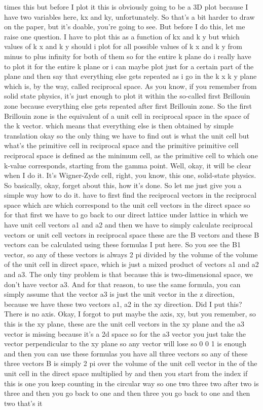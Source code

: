 times this but before I plot it this is obviously going to be a 3D plot because I have two variables here, kx and ky, unfortunately. So that's a bit harder to draw on the paper, but it's doable, you're going to see.
But before I do this, let me raise one question. I have to plot this as a function of kx and k y but which values of k x and k y should i plot for all possible values of k x and k y from minus to plus infinity for both of them so for the entire k plane do i really have to plot it for the entire k plane or i can maybe plot just for a certain part of the plane and then say that everything else gets repeated as i go in the k x k y plane which is, by the way, called reciprocal space. As you know, if you remember from solid state physics, it's just enough to plot it within the so-called first Brillouin zone because everything else gets repeated after first Brillouin zone. So the first Brillouin zone is the equivalent of a unit cell in reciprocal space in the space of the k vector. which means that everything else is then obtained by simple translation okay so the only thing we have to find out is what the unit cell but what's the primitive cell in reciprocal space and the primitive primitive cell reciprocal space is defined as the minimum cell, as the primitive cell to which one k-value corresponds, starting from the gamma point. Well, okay, it will be clear when I do it. It's Wigner-Zyde cell, right, you know, this one, solid-state physics. So basically, okay, forget about this, how it's done. So let me just give you a simple way how to do it. have to first find the reciprocal vectors in the reciprocal space which are which correspond to the unit cell vectors in the direct space so for that first we have to go back to our direct lattice under lattice in which we have unit cell vectors a1 and a2 and then we have to simply calculate reciprocal vectors or unit cell vectors in reciprocal space these are the B vectors and these B vectors can be calculated using these formulas I put here. So you see the B1 vector, so any of these vectors is always 2 pi divided by the volume of the volume of the unit cell in direct space, which is just a mixed product of vectors a1 and a2 and a3. The only tiny problem is that because this is two-dimensional space, we don't have vector a3. And for that reason, to use the same formula, you can simply assume that the vector a3 is just the unit vector in the z direction, because we have these two vectors a1, a2 in the xy direction. Did I put this? There is no axis. Okay, I forgot to put maybe the axis, xy, but you remember, so this is the xy plane, these are the unit cell vectors in the xy plane and the a3 vector is missing because it's a 2d space so for the a3 vector you just take the vector perpendicular to the xy plane so any vector will lose so 0 0 1 is enough and then you can use these formulas you have all three vectors so any of these three vectors B is simply 2 pi over the volume of the unit cell vector in the of the unit cell in the direct space multiplied by and then you start from the index if this is one you keep counting in the circular way so one two three two after two is three and then you go back to one and then three you go back to one and then two that's it 